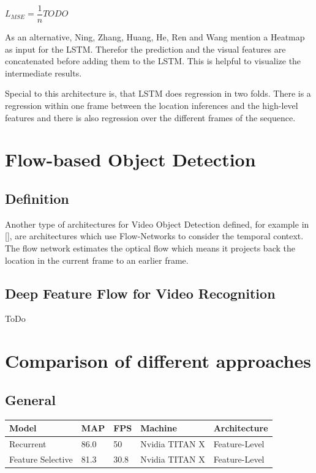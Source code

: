 \documentclass[conference]{IEEEtran}
\begin{document}
$ L_{MSE} = \dfrac{1}{n} TODO $ \newline

As an alternative, Ning, Zhang, Huang, He, Ren and Wang mention a Heatmap as  input for the LSTM. Therefor the prediction and the visual features are concatenated before adding them to the LSTM. This is helpful to visualize the intermediate results. \newline

Special to this architecture is, that LSTM does regression in two folds. There is a regression within one frame between the location inferences and the high-level features and there is also regression over the different frames of the sequence. 

\section{Flow-based Object Detection}

\subsection{Definition}
Another type  of architectures for Video Object Detection defined, for example in [], are architectures which use Flow-Networks to consider the temporal context. The flow network estimates the optical flow which means it projects back the location in the current frame to an earlier frame. 

\subsection{Deep Feature Flow for Video Recognition}
ToDo


\section{Comparison of different approaches}

\subsection{General}
\begin{tabular}{ | p{2cm} | p{2em}| p{2em} | p{4em} | p{5em} | } 
 \hline
 Model & MAP & FPS & Machine & Architecture \\
 \hline
 Recurrent \cite{b1} & 86.0 & 50 & Nvidia TITAN X & Feature-Level \\
 \hline
 Feature Selective \cite{b6} & 81.3 & 30.8 & Nvidia TITAN X & Feature-Level \\
 \hline
\end{tabular}
\end{document}
